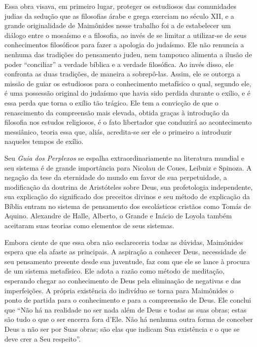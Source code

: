 Essa obra visava, em primeiro lugar, proteger os estudiosos das
comunidades judias da sedução que as filosofias árabe e grega exerciam
no século XII, e a grande originalidade de Maimônides nesse trabalho foi
a de estabelecer um diálogo entre o mosaísmo e a filosofia, ao invés de
se limitar a utilizar-se de seus conhecimentos filosóficos para fazer a
apologia do judaísmo. Ele não renuncia a nenhuma das tradições do
pensamento judeu, nem tampouco alimenta a ilusão de poder ``conciliar''
a verdade bíblica e a verdade filosófica. Ao invés disso, ele confronta
as duas tradições, de maneira a sobrepô-las. Assim, ele se outorga a
missão de guiar os estudiosos para o conhecimento metafísico o qual,
segundo ele, é uma possessão original do judaísmo que havia sido perdida
durante o exílio, e é essa perda que torna o exílio tão trágico. Ele tem
a convicção de que o renascimento da compreensão mais elevada, obtida
graças à introdução da filosofia nos estudos religiosos, é o fato
libertador que conduzirá ao acontecimento messiânico, teoria essa que,
aliás, acredita-se ser ele o primeiro a introduzir naqueles tempos de
exílio.

Seu \emph{Guia dos Perplexos} se espalha extraordinariamente na
literatura mundial e seu sistema é de grande importância para Nicolau de
Coues, Leibniz e Spinoza. A negação da tese da eternidade do mundo em
favor de sua perpetuidade, a modificação da doutrina de Aristóteles
sobre Deus, sua profetologia independente, sua explicação do significado
dos preceitos divinos e seu método de explicação da Bíblia entram no
sistema de pensamento dos escolásticos cristãos como Tomás de Aquino.
Alexandre de Halle, Alberto, o Grande e Inácio de Loyola também
aceitaram suas teorias como elementos de seus sistemas.

Embora ciente de que essa obra não esclareceria todas as dúvidas,
Maimônides espera que ela afaste as principais. A aspiração a conhecer
Deus, necessidade de seu pensamento presente desde sua juventude, faz
com que ele se lance à procura de um sistema metafísico. Ele adota a
razão como método de meditação, esperando chegar ao conhecimento de Deus
pela eliminação de negativas e das imperfeições. A própria existência do
indivíduo se torna para Maimônides o ponto de partida para o
conhecimento e para a compreensão de Deus. Ele conclui que ``Não há na
realidade no ser nada além de Deus e todas as suas obras; estas são
tudo o que o ser encerra fora d'Ele. Não há nenhuma outra forma de
conceber Deus a não ser por Suas obras; são elas que indicam Sua
existência e o que se deve crer a Seu respeito''.

